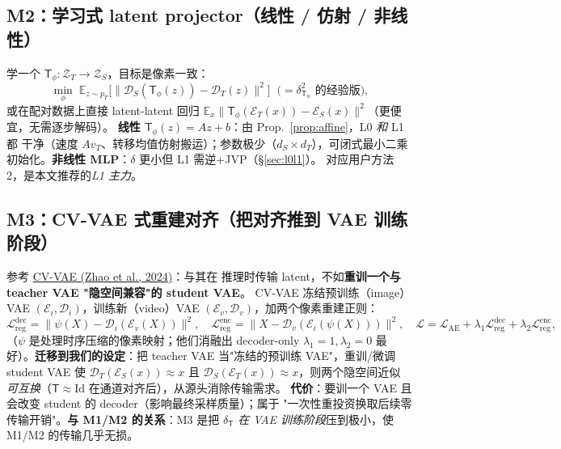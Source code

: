 \documentclass[11pt,a4paper]{article}
\newcommand{\loss}{\mathcal{L}}
\newcommand{\E}{\mathbb{E}}
\newcommand{\Enc}{\mathcal{E}}
\newcommand{\Dec}{\mathcal{D}}
\newcommand{\Zt}{\mathcal{Z}_T}
\newcommand{\Zs}{\mathcal{Z}_S}
\newcommand{\Tmap}{\mathsf{T}}
\newcommand{\vT}{v_{T}}
\theoremstyle{definition}
\begin{document}
\subsection{M2：学习式 latent projector（线性 / 仿射 / 非线性）}

学一个 $\Tmap_\phi:\Zt\to\Zs$，目标是像素一致：
\begin{equation}
\min_\phi\;
\E_{z\sim p_T}\Big[\big\lVert \Dec_S(\Tmap_\phi(z))-\Dec_T(z)\big\rVert^2\Big]
\;\;\Big(=\delta_{\Tmap_\phi}^2\text{ 的经验版}\Big),
\label{eq:m2-train}
\end{equation}
或在配对数据上直接 latent-latent 回归
$\E_{x}\lVert \Tmap_\phi(\Enc_T(x))-\Enc_S(x)\rVert^2$（更便宜，无需逐步解码）。
\textbf{线性 $\Tmap_\phi(z)=Az+b$}：由 Prop.~\ref{prop:affine}，L0 \emph{和} L1 都
干净（速度 $A\vT$、转移均值仿射搬运）；参数极少（$d_S\!\times\!d_T$），可闭式最小二乘
初始化。\textbf{非线性 MLP}：$\delta$ 更小但 L1 需逆+JVP（\S\ref{sec:l0l1}）。
对应用户方法 2，是本文推荐的\emph{L1 主力}。

\subsection{M3：CV-VAE 式重建对齐（把对齐推到 VAE 训练阶段）}

参考 \href{https://arxiv.org/abs/2405.20279}{CV-VAE (Zhao et al., 2024)}：与其在
推理时传输 latent，不如\textbf{重训一个与 teacher VAE "隐空间兼容"的 student VAE}。
CV-VAE 冻结预训练（image）VAE $(\Enc_i,\Dec_i)$，训练新（video）VAE
$(\Enc_v,\Dec_v)$，加两个像素重建正则：
\begin{equation}
\loss_{\mathrm{reg}}^{\mathrm{dec}}=\big\lVert \psi(X)-\Dec_i(\Enc_v(X))\big\rVert^2,
\quad
\loss_{\mathrm{reg}}^{\mathrm{enc}}=\big\lVert X-\Dec_v(\Enc_i(\psi(X)))\big\rVert^2,
\quad
\loss=\loss_{\mathrm{AE}}+\lambda_1\loss_{\mathrm{reg}}^{\mathrm{dec}}
+\lambda_2\loss_{\mathrm{reg}}^{\mathrm{enc}},
\label{eq:cvvae}
\end{equation}
（$\psi$ 是处理时序压缩的像素映射；他们消融出 decoder-only $\lambda_1{=}1,\lambda_2{=}0$
最好）。\textbf{迁移到我们的设定}：把 teacher VAE 当"冻结的预训练 VAE"，重训/微调
student VAE 使
$\Dec_T(\Enc_S(x))\approx x$ 且 $\Dec_S(\Enc_T(x))\approx x$，则两个隐空间近似
\emph{可互换}（$\Tmap\approx \mathrm{Id}$ 在通道对齐后），从源头消除传输需求。
\textbf{代价}：要训一个 VAE 且会改变 student 的 decoder（影响最终采样质量）；属于
"一次性重投资换取后续零传输开销"。\textbf{与 M1/M2 的关系}：M3 是把 $\delta_{\Tmap}$
\emph{在 VAE 训练阶段}压到极小，使 M1/M2 的传输几乎无损。
\end{document}
